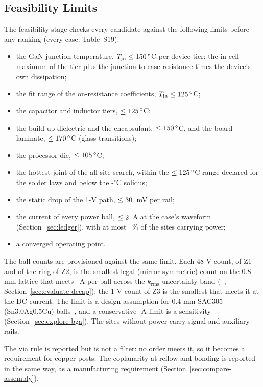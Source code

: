 \subsection{Feasibility Limits}\label{sec:feasibility}
The feasibility stage checks every candidate against the following limits before any ranking
(every case: Table~S19):
\begin{itemize}
\item the GaN junction temperature, $T_{\mathrm{jn}} \le 150\,^\circ$C per device tier:
the in-cell maximum of the tier plus the junction-to-case resistance times the device's own
dissipation;
\item the fit range of the on-resistance coefficients, $T_{\mathrm{jn}} \le 125\,^\circ$C;
\item the capacitor and inductor tiers, $\le 125\,^\circ$C;
\item the build-up dielectric and the encapsulant, $\le 150\,^\circ$C, and the board
laminate, $\le 170\,^\circ$C (glass transitions);
\item the processor die, $\le 105\,^\circ$C;
\item the hottest joint of the all-site search, within the $\le125\,^\circ$C range
declared for the solder laws and below the \MthLimSolidus-$^\circ$C solidus;
\item the static drop of the 1-V path, $\le 30$~mV per rail;
\item the current of every power ball, $\le 2$~A at the case's waveform
(Section~\ref{sec:ledger}), with at most \MthLimSites~\% of the sites carrying power;
\item a converged operating point.
\end{itemize}
The ball counts are provisioned against the same limit. Each 48-V count, of Z1 and of the ring of
Z2, is the smallest legal (mirror-symmetric) count on the 0.8-mm lattice that meets
\WrBgaRule~A per ball across the $k_{\mathrm{rms}}$ uncertainty band (\WrKrmsLo--\WrKrmsHi,
Section~\ref{sec:evaluate-decap}); the 1-V count of Z3 is the smallest that meets it at the DC
current. The limit is a design assumption for 0.4-mm SAC305 (Sn3.0Ag0.5Cu)
balls~\cite{Kuan2015Imax}, and a conservative \WrBgaRuleSens-A limit is a sensitivity
(Section~\ref{sec:explore-bga}). The sites without power carry signal and auxiliary rails.

The via rule is reported but is not a filter: no order meets it, so it becomes a requirement for
copper posts. The coplanarity at reflow and bonding is reported in the same way, as a manufacturing
requirement (Section~\ref{sec:compare-assembly}).
